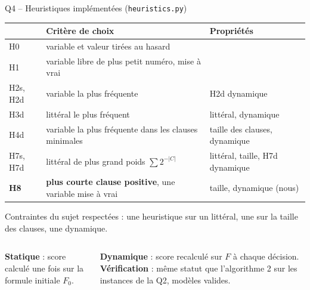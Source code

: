 \documentclass[aspectratio=169,11pt]{beamer}
\begin{document}
\begin{frame}{Q4 -- Heuristiques implémentées (\texttt{heuristics.py})}
  \begin{center}\small
  \begin{tabular}{@{}l>{\raggedright\arraybackslash}p{}>{\raggedright\arraybackslash}p{}@{}}
    \toprule
    & Critère de choix & Propriétés \\
    \midrule
    H0 & variable et valeur tirées au hasard & \\
    H1 & variable libre de plus petit numéro, mise à vrai & \\
    H2s, H2d & variable la plus fréquente & H2d dynamique \\
    H3d & littéral le plus fréquent & littéral, dynamique \\
    H4d & variable la plus fréquente dans les clauses minimales & taille des clauses, dynamique \\
    H7s, H7d & littéral de plus grand poids $\sum 2^{-|C|}$ & littéral, taille, H7d dynamique \\
    \textbf{H8} & \textbf{plus courte clause positive}, une variable mise à vrai & taille, dynamique (nous) \\
    \bottomrule
  \end{tabular}
  \end{center}
  {\footnotesize Contraintes du sujet respectées : une heuristique sur un littéral, une sur la taille des clauses, une dynamique.\par}
  \smallskip

  \begin{columns}[T]
    \textbf{Statique} : score calculé une fois sur la formule initiale $F_0$.\par
    \textbf{Dynamique} : score recalculé sur $F$ à chaque décision.
    \textbf{Vérification} : même statut que l'algorithme 2 sur les instances de la Q2, modèles valides.
  \end{columns}
\end{frame}
\end{document}
